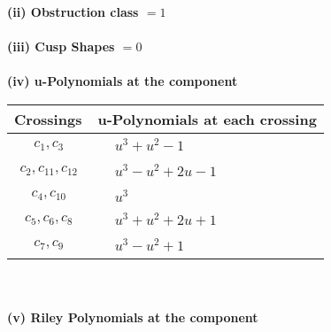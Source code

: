 \documentclass[1p]{elsarticle_modified}
\theoremstyle{definition}
\begin{document}
\flushleft \textbf{(ii) Obstruction class $= 1$}\\~\\
\flushleft \textbf{(iii) Cusp Shapes $= 0$}\\~\\
\newpage\renewcommand{\arraystretch}{1}
\flushleft \textbf{(iv) u-Polynomials at the component}\newline \\
\begin{tabular}{m{50pt}|m{274pt}}
Crossings & \hspace{64pt}u-Polynomials at each crossing \\
\hline $$\begin{aligned}c_{1},c_{3}\end{aligned}$$&$\begin{aligned}
&u^3+u^2-1
\end{aligned}$\\
\hline $$\begin{aligned}c_{2},c_{11},c_{12}\end{aligned}$$&$\begin{aligned}
&u^3- u^2+2 u-1
\end{aligned}$\\
\hline $$\begin{aligned}c_{4},c_{10}\end{aligned}$$&$\begin{aligned}
&u^3
\end{aligned}$\\
\hline $$\begin{aligned}c_{5},c_{6},c_{8}\end{aligned}$$&$\begin{aligned}
&u^3+u^2+2 u+1
\end{aligned}$\\
\hline $$\begin{aligned}c_{7},c_{9}\end{aligned}$$&$\begin{aligned}
&u^3- u^2+1
\end{aligned}$\\
\hline
\end{tabular}\\~\\
\newpage\renewcommand{\arraystretch}{1}
\flushleft \textbf{(v) Riley Polynomials at the component}\newline \\
\end{document}
